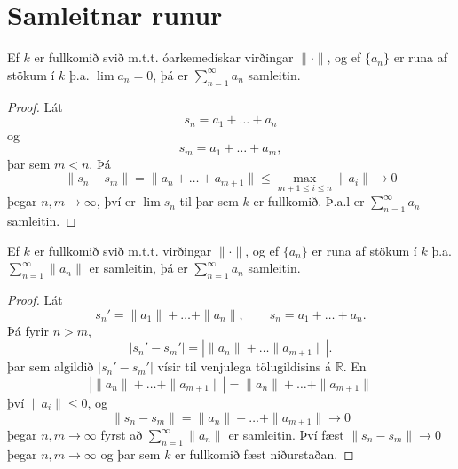 
\section*{Samleitnar runur}
\begin{setn}
Ef $k$ er fullkomið svið m.t.t. óarkemedískar virðingar $\| \cdot  \|$, og ef $\{ a_n \} $ er 
runa af stökum í $k$ þ.a. $\lim a_n = 0$, þá er $\sum_{n=1}^\infty a_n$ samleitin.
\end{setn}
\begin{proof}
Lát 
\begin{equation*}
s_n = a_1+ \ldots + a_n
\end{equation*}
og
\begin{equation*}
s_m = a_1 + \ldots + a_m,
\end{equation*}
þar sem $m < n$. Þá
\begin{equation*}
\|s_n - s_m \| = \| a_n + \ldots + a_{m+1} \| \leq \max_{m+1 \leq i \leq n} \|a_i\| \rightarrow 0
\end{equation*}
þegar $n,m \rightarrow \infty$, því er $\lim s_n$ til þar sem $k$ er fullkomið. Þ.a.l er $\sum_{n=1}^\infty a_n$ samleitin.
\end{proof}

\begin{setn}
Ef $k$ er fullkomið svið m.t.t. virðingar $\| \cdot \|$, og ef $\{ a_n \}$ er runa af stökum í $k$ 
þ.a. $\sum_{n=1}^{\infty} \| a_n \| $ er samleitin, þá er $\sum_{n=1}^\infty a_n $ samleitin. 
\end{setn}
\begin{proof}
Lát 
\begin{equation*}
 s_n' = \| a_1 \| + \ldots + \|a_n\|, \qquad s_n = a_1 + \ldots + a_n.
\end{equation*}
Þá fyrir $n>m$, 
\begin{equation*}
|s_n'- s_m' | = | \| a_n \| + \ldots \|a_{m+1}\| |.
\end{equation*}
þar sem algildið $| s_n' - s_m' | $ vísir til venjulega  tölugildisins á $\mathbb{R}$. En 
\begin{equation*}
| \| a_n \| + \ldots + \| a_{m+1} \| | = \| a_n \| + \ldots + \| a_{m+1} \|
\end{equation*}
því $\| a_i \| \leq 0$, og 
\begin{equation}
\| s_n - s_m \| = \|a_n\| + \ldots + \|a_{m+1}\| \rightarrow 0
\end{equation}
þegar $n,m \rightarrow \infty$ fyrst að $\sum_{n=1}^\infty \|a_n\|$ er samleitin. 
Því fæst $\|s_n - s_m \| \rightarrow 0$ þegar $n,m \rightarrow \infty $ og þar sem $k$ er fullkomið fæst niðurstaðan.  
\end{proof}

